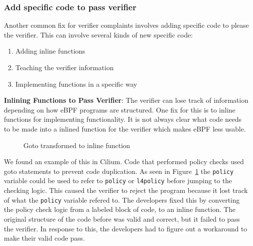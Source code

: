 \subsubsection{Add specific code to pass verifier}
Another common fix for verifier complaints involves adding specific code to please
    the verifier.
This can involve several kinds of new specific code:

\begin{enumerate}
    \item Adding inline functions
    \item Teaching the verifier information
    \item Implementing functions in a specific way
\end{enumerate}

\noindent\textbf{Inlining Functions to Pass Verifier}:
The verifier can lose track of information depending on how eBPF programs are structured.
One fix for this is to inline functions for implementing functionality.
It is not always clear what code needs to be made into a inlined function for the verifier
    which makes eBPF less usable.

\begin{figure}
    
    \caption{Goto transformed to inline function}
    \label{fig:inline-fig}
\end{figure}

%
%

We found an example of this in Cilium.
Code that performed policy checks used goto statements to prevent code duplication.
As seen in Figure~\ref{fig:inline-fig} the \texttt{policy} variable could be used to refer to \texttt{policy} or \texttt{l4policy} before jumping to the checking logic.
This caused the verifier to reject the program because it lost track of what the \texttt{policy} variable refered to.
The developers fixed this by converting the policy check logic from a labeled block of code, to an inline function.
The original structure of the code before was valid and correct, but it failed to pass the verifier.
In response to this, the developers had to figure out a workaround to make their valid code pass.

